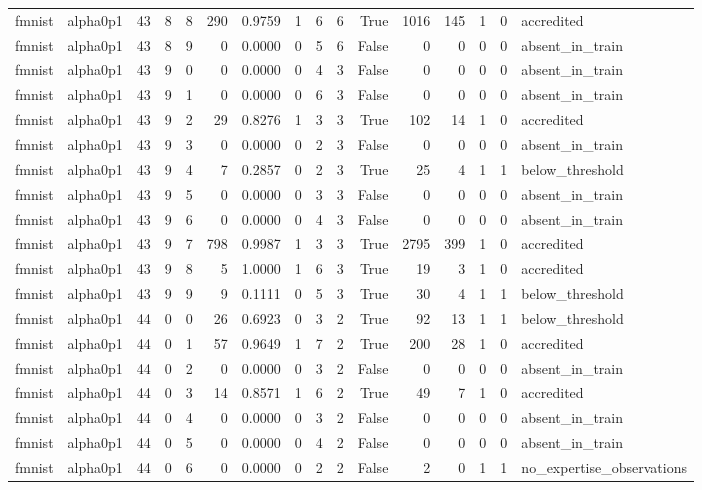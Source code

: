 \begin{tabular}{llrrrrrrrrrrrrrl}
fmnist & alpha0p1 & 43 & 8 & 8 & 290 & 0.9759 & 1 & 6 & 6 & True & 1016 & 145 & 1 & 0 & accredited \\
fmnist & alpha0p1 & 43 & 8 & 9 & 0 & 0.0000 & 0 & 5 & 6 & False & 0 & 0 & 0 & 0 & absent\_in\_train \\
fmnist & alpha0p1 & 43 & 9 & 0 & 0 & 0.0000 & 0 & 4 & 3 & False & 0 & 0 & 0 & 0 & absent\_in\_train \\
fmnist & alpha0p1 & 43 & 9 & 1 & 0 & 0.0000 & 0 & 6 & 3 & False & 0 & 0 & 0 & 0 & absent\_in\_train \\
fmnist & alpha0p1 & 43 & 9 & 2 & 29 & 0.8276 & 1 & 3 & 3 & True & 102 & 14 & 1 & 0 & accredited \\
fmnist & alpha0p1 & 43 & 9 & 3 & 0 & 0.0000 & 0 & 2 & 3 & False & 0 & 0 & 0 & 0 & absent\_in\_train \\
fmnist & alpha0p1 & 43 & 9 & 4 & 7 & 0.2857 & 0 & 2 & 3 & True & 25 & 4 & 1 & 1 & below\_threshold \\
fmnist & alpha0p1 & 43 & 9 & 5 & 0 & 0.0000 & 0 & 3 & 3 & False & 0 & 0 & 0 & 0 & absent\_in\_train \\
fmnist & alpha0p1 & 43 & 9 & 6 & 0 & 0.0000 & 0 & 4 & 3 & False & 0 & 0 & 0 & 0 & absent\_in\_train \\
fmnist & alpha0p1 & 43 & 9 & 7 & 798 & 0.9987 & 1 & 3 & 3 & True & 2795 & 399 & 1 & 0 & accredited \\
fmnist & alpha0p1 & 43 & 9 & 8 & 5 & 1.0000 & 1 & 6 & 3 & True & 19 & 3 & 1 & 0 & accredited \\
fmnist & alpha0p1 & 43 & 9 & 9 & 9 & 0.1111 & 0 & 5 & 3 & True & 30 & 4 & 1 & 1 & below\_threshold \\
fmnist & alpha0p1 & 44 & 0 & 0 & 26 & 0.6923 & 0 & 3 & 2 & True & 92 & 13 & 1 & 1 & below\_threshold \\
fmnist & alpha0p1 & 44 & 0 & 1 & 57 & 0.9649 & 1 & 7 & 2 & True & 200 & 28 & 1 & 0 & accredited \\
fmnist & alpha0p1 & 44 & 0 & 2 & 0 & 0.0000 & 0 & 3 & 2 & False & 0 & 0 & 0 & 0 & absent\_in\_train \\
fmnist & alpha0p1 & 44 & 0 & 3 & 14 & 0.8571 & 1 & 6 & 2 & True & 49 & 7 & 1 & 0 & accredited \\
fmnist & alpha0p1 & 44 & 0 & 4 & 0 & 0.0000 & 0 & 3 & 2 & False & 0 & 0 & 0 & 0 & absent\_in\_train \\
fmnist & alpha0p1 & 44 & 0 & 5 & 0 & 0.0000 & 0 & 4 & 2 & False & 0 & 0 & 0 & 0 & absent\_in\_train \\
fmnist & alpha0p1 & 44 & 0 & 6 & 0 & 0.0000 & 0 & 2 & 2 & False & 2 & 0 & 1 & 1 & no\_expertise\_observations \\

\end{tabular}
